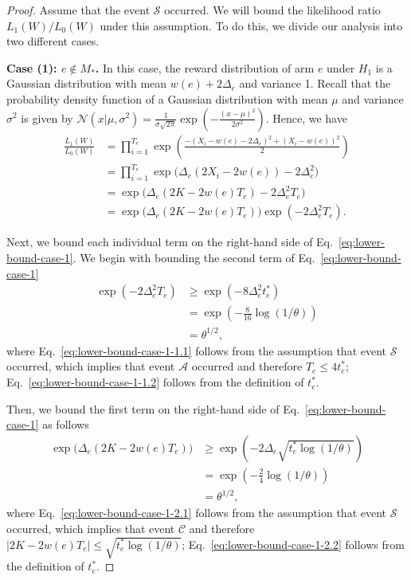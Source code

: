 \documentclass{article}
\begin{document}
\begin{proof}
Assume that the event $\mathcal S$ occurred.
We will bound the likelihood ratio $L_1(W)/L_0(W)$ under this assumption. 
To do this, we divide our analysis into two different cases.

\textbf{Case (1): $e\not \in M_*$.}
In this case, the reward distribution of arm $e$ under $H_1$ is a Gaussian distribution with mean $w(e)+2\Delta_e$ and variance 1. 
Recall that the probability density function of a Gaussian distribution with mean $\mu$ and variance $\sigma^2$ is given by
$\mathcal N(x | \mu,\sigma^2)=\frac{1}{\sigma\sqrt{2\pi}}\exp\left(-\frac{(x-\mu)^2}{2\sigma^2}\right)$.
Hence, we have
\begin{align}
  \frac{L_1(W)}{L_0(W)} &= \prod_{i=1}^{T_e} \exp\left(\frac{-(X_i-w(e)-2\Delta_e)^2+(X_i-w(e))^2}{2}\right) \nonumber \\
  						&= \prod_{i=1}^{T_e} \exp\big(\Delta_e(2X_i-2w(e))-2\Delta_e^2\big) \nonumber \\
  						&= \exp\big(\Delta_e(2K-2w(e)T_e)-2\Delta_e^2T_e\big) \nonumber \\
  						&= \exp\big(\Delta_e(2K-2w(e)T_e)\big)\exp(-2\Delta_e^2T_e) \label{eq:lower-bound-case-1}.
\end{align}

Next, we bound each individual term on the right-hand side of Eq.~\eqref{eq:lower-bound-case-1}.
We begin with bounding the second term of Eq.~\eqref{eq:lower-bound-case-1}
\begin{align}
	\exp(-2\Delta_e^2T_e) &\ge \exp(-8\Delta_e^2t_e^*) \label{eq:lower-bound-case-1-1.1} \\
						  &=\exp\left(-\frac{8}{16}\log(1/\theta)\right) \label{eq:lower-bound-case-1-1.2}\\
						  &= \theta^{1/2}\label{eq:lower-bound-case-1-1.3},
\end{align}
where Eq.~\eqref{eq:lower-bound-case-1-1.1} follows from the assumption that event $\mathcal S$ occurred, which implies that event $\mathcal A$ occurred and therefore $T_e \le 4t_e^*$; Eq.~\eqref{eq:lower-bound-case-1-1.2} follows from the definition of $t_e^*$.

Then, we bound the first term on the right-hand side of Eq.~\eqref{eq:lower-bound-case-1} as follows
\begin{align}
	\exp\big(\Delta_e(2K-2w(e)T_e)\big) & \ge \exp\left(-2\Delta_e\sqrt{t_e^*\log(1/\theta)}\right) \label{eq:lower-bound-case-1-2.1}\\
								       & = \exp\left(-\frac{2}{4}\log(1/\theta)\right) \label{eq:lower-bound-case-1-2.2}\\
								       &=\theta^{1/2},  \label{eq:lower-bound-case-1-2.3}
\end{align}
where Eq.~\eqref{eq:lower-bound-case-1-2.1} follows from the assumption that event $\mathcal S$ occurred, which implies that event $\mathcal C$ and therefore $|2K-2w(e)T_e| \le \sqrt{t_e^*\log(1/\theta)}$; 
Eq.~\eqref{eq:lower-bound-case-1-2.2} follows from the definition of $t_e^*$.


\end{proof}
\end{document}
